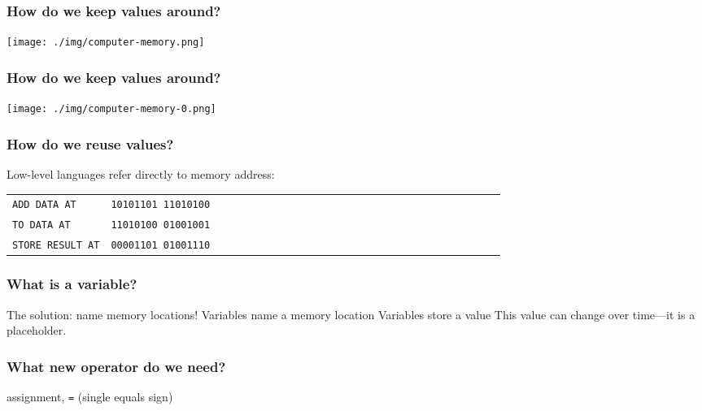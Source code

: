 \documentclass[11pt]{beamer}
\begin{document}
\begin{frame}
  \frametitle{How do we keep values around?}
  \texttt{[image: ./img/computer-memory.png]}
\end{frame}

\begin{frame}
  \frametitle{How do we keep values around?}
  \texttt{[image: ./img/computer-memory-0.png]}
\end{frame}

\begin{frame}
  \frametitle{How do we reuse values?}
  \Enlarge

  \begin{itemize}
  \myitem  Low-level languages refer directly to memory address:
  \begin{tabular}{*{27}{l}}
    \texttt{ADD DATA AT}     & \texttt{10101101 11010100} \\
    \texttt{TO DATA AT}      & \texttt{11010100 01001001} \\
    \texttt{STORE RESULT AT} & \texttt{00001101 01001110} \\
  \end{tabular}
  \end{itemize}
\end{frame}

\begin{frame}
  \frametitle{What is a \textbf{variable}?}
  \Enlarge

  \begin{itemize}
  \myitem  The solution:  \textcolor{CS101GradBot}{name memory locations!} \pause
  \myitem  Variables name a memory location \pause
  \myitem  Variables store a value \pause
  \myitem  This value can change over time---it is a placeholder.
  \end{itemize}
\end{frame}

\begin{frame}
  \frametitle{What new operator do we need?}
  \Enlarge

  \begin{itemize}
  \myitem  assignment, \texttt{=} (single equals sign)
  \end{itemize}
\end{frame}
\end{document}
